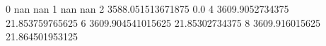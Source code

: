 0 nan nan
1 nan nan
2 3588.051513671875 0.0
4 3609.9052734375 21.853759765625
6 3609.904541015625 21.85302734375
8 3609.916015625 21.864501953125

